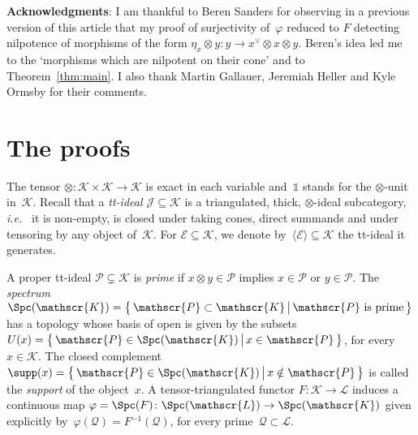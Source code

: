 \documentclass{amsart}
\numberwithin{equation}{section}
\theoremstyle{remark}
\begin{document}
\medbreak
\noindent
\textbf{Acknowledgments}: I am thankful to Beren Sanders for observing in a previous version of this article that my proof of surjectivity of~$\varphi$ reduced to $F$ detecting nilpotence of morphisms of the form $\eta_x\otimes y\colon y\to x^\vee\otimes x\otimes y$. Beren's idea led me to the `morphisms which are nilpotent on their cone' and to Theorem~\ref{thm:main}. I also thank Martin Gallauer, Jeremiah Heller and Kyle Ormsby for their comments.

\goodbreak
\section{The proofs}
\label{se:proofs}\medbreak

The tensor $\otimes\colon{\mathscr{{K}}}\times{\mathscr{{K}}}{\mathop{\longrightarrow}\limits} {\mathscr{{K}}}$ is exact in each variable and~${\mathbb{1}}$ stands for the $\otimes$-unit in~${\mathscr{{K}}}$. Recall that a \emph{tt-ideal ${\mathscr{{J}}}\subseteq {\mathscr{{K}}}$} is a triangulated, thick, $\otimes$-ideal subcategory, {{\sl i.e.}\ } it is non-empty, is closed under taking cones, direct summands and under tensoring by any object of~${\mathscr{{K}}}$. For $\mathcal{E}\subseteq {\mathscr{{K}}}$, we denote by~${\langle {\mathcal{E}}\rangle}\subseteq{\mathscr{{K}}}$ the tt-ideal it generates.

A proper tt-ideal ${{\mathscr{{P}}}}\subsetneq{\mathscr{{K}}}$ is \emph{prime} if $x\otimes y\in{{\mathscr{{P}}}}$ implies $x\in{{\mathscr{{P}}}}$ or $y\in{{\mathscr{{P}}}}$. The \emph{spectrum} ${\Spc({\mathscr{K}})}={\big\{\,{{{\mathscr{{P}}}}\subset{\mathscr{{K}}}}\,\big|\,{{{\mathscr{{P}}}}\textrm{ is prime}}\,\big\}}$ has a topology whose basis of open is given by the subsets $U(x)={\big\{\,{{{\mathscr{{P}}}}\in{\Spc({\mathscr{K}})}}\,\big|\,{x\in {{\mathscr{{P}}}}}\,\big\}}$, for every~$x\in{\mathscr{{K}}}$. The closed complement $\supp(x)={\big\{\,{{{\mathscr{{P}}}}\in{\Spc({\mathscr{K}})}}\,\big|\,{x\notin{{\mathscr{{P}}}}}\,\big\}}$ is called the \emph{support} of the object~$x$. A tensor-triangulated functor $F\colon{\mathscr{{K}}}\to{\mathscr{{L}}}$ induces a continuous map $\varphi=\Spc(F)\colon{\Spc({\mathscr{L}})}\to {\Spc({\mathscr{K}})}$ given explicitly by~$\varphi({{\mathscr{{Q}}}})=F{^{-1}}({{\mathscr{{Q}}}})$, for every prime~${{\mathscr{{Q}}}}\subset{\mathscr{{L}}}$.
\end{document}
